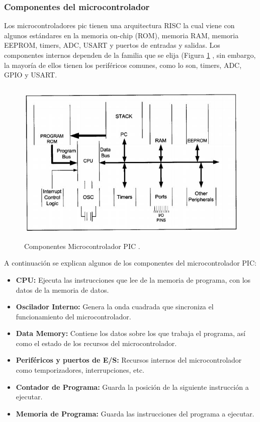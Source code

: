 \documentclass[12pt,a4paper]{article}
\begin{document}
   \subsubsection{Componentes del microcontrolador}
   Los microcontroladores pic tienen una arquitectura RISC la cual viene con algunos estándares en la memoria on-chip (ROM), memoria RAM, memoria EEPROM, timers, ADC, USART  y puertos de entradas y salidas. Los componentes internos dependen de la familia que se elija (Figura \ref{fig:ComponentesPIC} , sin embargo, la mayoría de ellos tienen los periféricos comunes, como lo son, timers, ADC, GPIO y USART\cite{Muha}.
   
   \begin{figure}[htpb]
   \centering
   \includegraphics[height=8cm]{ComponentesPIC}
   \caption{Componentes Microcontrolador PIC \cite{Muha}.}
   \label{fig:ComponentesPIC}
   \end{figure}
   
   A continuación se explican algunos de los componentes del microcontrolador PIC:
   \begin{itemize}
   		\item \textbf{CPU:} Ejecuta las instrucciones que lee de la memoria de programa, con los datos de la memoria de datos.
   		\item \textbf{Oscilador Interno:} Genera la onda cuadrada que sincroniza el funcionamiento del microcontrolador.
   		\item \textbf{Data Memory:} Contiene los datos sobre los que trabaja el programa, así como el estado de los recursos del microcontrolador.
   		\item \textbf{Periféricos y puertos de E/S:} Recursos internos del microcontrolador como temporizadores, interrupciones, etc.
   		\item \textbf{Contador de Programa:} Guarda la posición de la siguiente instrucción a ejecutar.
   		\item \textbf{Memoria de Programa:} Guarda las instrucciones del programa a ejecutar.
   		
   \end{itemize}
   
\end{document}
